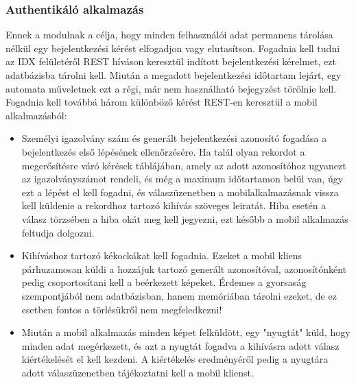 \subsubsection{Authentikáló alkalmazás}
Ennek a modulnak a célja, hogy minden felhasználói adat permanens tárolása nélkül egy bejelentkezési kérést elfogadjon vagy elutasítson. Fogadnia kell tudni az IDX felületéről REST híváson keresztül indított bejelentkezési kérelmet, ezt adatbázisba tárolni kell. Miután a megadott bejelentkezési időtartam lejárt, egy automata műveletnek ezt a régi, már nem használható bejegyzést törölnie kell.\\
Fogadnia kell továbbá három különböző kérést REST-en keresztül a mobil alkalmazásból:
\begin{itemize}
\item Személyi igazolvány szám és generált bejelentkezési azonosító fogadása a bejelentkezés első lépésének ellenőrzésére. Ha talál olyan rekordot a megerősítésre váró kérések táblájában, amely az adott azonosítóhoz ugyanezt az igazolványszámot rendeli, és még a maximum időtartamon belül van, úgy ezt a lépést el kell fogadni, és válaszüzenetben a mobilalkalmazásnak vissza kell küldenie a rekordhoz tartozó kihívás szöveges leiratát. Hiba esetén a válasz törzsében a hiba okát meg kell jegyezni, ezt később a mobil alkalmazás feltudja dolgozni.
\item Kihíváshoz tartozó kékockákat kell fogadnia. Ezeket a mobil kliens párhuzamosan küldi a hozzájuk tartozó generált azonosítóval, azonosítónként pedig csoportosítani kell a beérkezett képeket. Érdemes a gyorsaság szempontjából nem adatbázisban, hanem memóriában tárolni ezeket, de ez esetben fontos a törlésükről nem megfeledkezni!
\item Miután a mobil alkalmazás minden képet felküldött, egy "nyugtát" küld, hogy minden adat megérkezett, és azt a nyugtát fogadva a kihívásra adott válasz kiértékelését el kell kezdeni. A kiértékelés eredményéről pedig a nyugtára adott válaszüzenetben tájékoztatni kell a mobil klienst.
\end{itemize}

